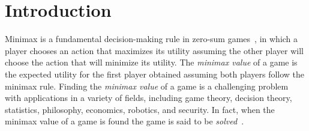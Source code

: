 \documentclass[letterpaper]{article} %
\begin{document}
\begin{abstract}

\end{abstract}




\section{Introduction}


Minimax is a fundamental decision-making rule in zero-sum games~\cite{wald1945statistical}, 
in which a player chooses an action that maximizes its utility assuming the other player will 
choose the action that will minimize its utility. The \emph{minimax value} of a game is the expected utility for the first player obtained assuming both players follow the minimax rule. 
Finding the \emph{minimax value} of a game is a challenging problem with applications in a variety of fields, including game theory, decision theory,  statistics, philosophy, economics, robotics, and security. 
In fact, when the minimax value of a game is found the game is said to be \emph{solved}~\cite{schaeffer2007checkers,irving2000solving,saffidine2011solving}. 
\end{document}
